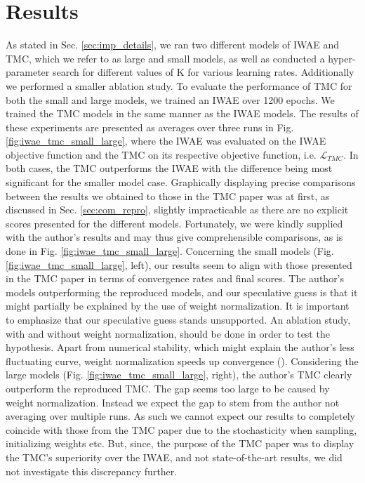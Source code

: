 \section{Results}
\label{results}
As stated in Sec. \ref{sec:imp_details}, we ran two different models of IWAE and TMC, which we refer to as large and small models, as well as conducted a hyper-parameter search for different values of K for various learning rates. Additionally we performed a smaller ablation study. To evaluate the performance of TMC for both the small and large models, we trained an IWAE over 1200 epochs. We trained the TMC models in the same manner as the IWAE models. The results of these experiments are presented as averages over three runs in Fig. \ref{fig:iwae_tmc_small_large}, where the IWAE was evaluated on the IWAE objective function and the TMC on its respective objective function, i.e. $\mathcal{L}_{TMC}$. In both cases, the TMC outperforms the IWAE with the difference being most significant for the smaller model case. Graphically displaying precise comparisons between the results we obtained to those in the TMC paper was at first, as discussed in Sec. \ref{sec:com_repro}, slightly impracticable as there are no explicit scores presented for the different models. Fortunately, we were kindly supplied with the author's results and may thus give comprehensible comparisons, as is done in Fig. \ref{fig:iwae_tmc_small_large}. Concerning the small models (Fig. \ref{fig:iwae_tmc_small_large}, left), our results seem to align with those presented in the TMC paper in terms of convergence rates and final scores. The author's models outperforming the reproduced models, and our speculative guess is that it might partially be explained by the use of weight normalization. It is important to emphasize that our speculative guess stands unsupported. An ablation study, with and without weight normalization, should be done in order to test the hypothesis. Apart from numerical stability, which might explain the author's less fluctuating curve, weight normalization speeds up convergence (\cite{weightnorm}). Considering the large models (Fig. \ref{fig:iwae_tmc_small_large}, right), the author's TMC clearly outperform the reproduced TMC. The gap seems too large to be caused by weight normalization. Instead we expect the gap to stem from the author not averaging over multiple runs. As such we cannot expect our results to completely coincide with those from the TMC paper due to the stochasticity when sampling, initializing weights etc. But, since, the purpose of the TMC paper was to display the TMC's superiority over the IWAE, and not state-of-the-art results, we did not investigate this discrepancy further. 

